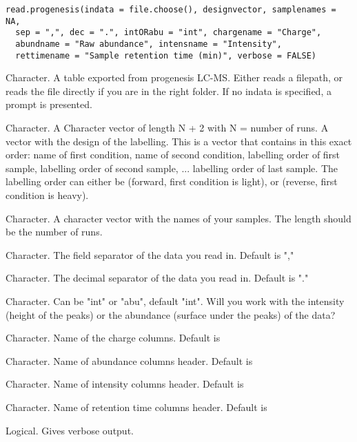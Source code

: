 \documentclass[letterpaper]{book}
\begin{document}
%
\begin{Usage}
\begin{verbatim}
read.progenesis(indata = file.choose(), designvector, samplenames = NA,
  sep = ",", dec = ".", intORabu = "int", chargename = "Charge",
  abundname = "Raw abundance", intensname = "Intensity",
  rettimename = "Sample retention time (min)", verbose = FALSE)
\end{verbatim}
\end{Usage}
%
\begin{Arguments}
\begin{ldescription}
\item[\code{indata}] Character. A table exported from progenesis LC-MS. Either reads a filepath, or reads the file directly if you are in the right folder. If no indata is specified, a prompt is presented.

\item[\code{designvector}] Character. A Character vector of length N + 2 with N = number of runs. A vector with the design of the labelling.  This is a vector that contains in this exact order: name of first condition, name of second condition, labelling order of first sample, labelling order of second sample, ... labelling order of last sample. The labelling order can either be  (forward, first condition is light), or  (reverse, first condition is heavy).

\item[\code{samplenames}] Character. A character vector with the names of your samples. The length should be the number of runs.

\item[\code{sep}] Character. The field separator of the data you read in. Default is ","

\item[\code{dec}] Character. The decimal separator of the data you read in. Default is "."

\item[\code{intORabu}] Character. Can be "int" or "abu", default "int". Will you work with the intensity (height of the peaks) or the abundance (surface under the peaks) of the data?

\item[\code{chargename}] Character. Name of the charge columns. Default is 

\item[\code{abundname}] Character. Name of abundance columns header. Default is 

\item[\code{intensname}] Character. Name of intensity columns header. Default is 

\item[\code{rettimename}] Character. Name of retention time columns header. Default is 

\item[\code{verbose}] Logical. Gives verbose output.
\end{ldescription}
\end{Arguments}
\end{document}
